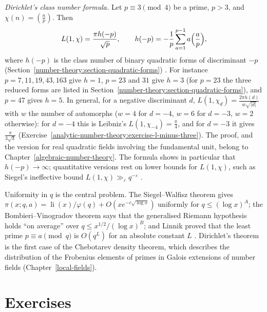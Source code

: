 \begin{remark}\label{analytic-number-theory:remark-class-number-formula}
\emph{Dirichlet's class number formula.} Let $p \equiv 3 \pmod 4$ be a prime, $p > 3$, and $\chi(n) = (\frac np)$. Then
\[
L(1, \chi) = \frac{\pi h(-p)}{\sqrt{p}}, \qquad h(-p) = -\frac1p\sum_{a=1}^{p-1}a\Bigl(\frac ap\Bigr),
\]
where $h(-p)$ is the class number of binary quadratic forms of discriminant $-p$ (Section~\ref{number-theory:section-quadratic-forms}) \cite{davenport-multiplicative}. For instance
$p = 7, 11, 19, 43, 163$ give $h = 1$, $p = 23$ and $31$ give $h = 3$ (for $p = 23$ the three reduced forms are listed in Section~\ref{number-theory:section-quadratic-forms}), and $p = 47$ gives $h = 5$. In general,
for a negative discriminant $d$, $L(1, \chi_d) = \frac{2\pi h(d)}{w\sqrt{|d|}}$ with $w$ the number of automorphs ($w = 4$ for $d = -4$, $w = 6$ for $d = -3$, $w = 2$ otherwise): for $d = -4$ this is
Leibniz's $L(1, \chi_{-4}) = \frac\pi4$, and for $d = -3$ it gives $\frac{\pi}{3\sqrt3}$ (Exercise~\ref{analytic-number-theory:exercise-l-minus-three}). The proof, and the version for real quadratic fields
involving the fundamental unit, belong to Chapter~\ref{algebraic-number-theory}. The formula shows in particular that $h(-p) \to \infty$; quantitative versions rest on lower bounds for $L(1, \chi)$, such as
Siegel's ineffective bound $L(1, \chi) \gg_\varepsilon q^{-\varepsilon}$ \cite{davenport-multiplicative}.
\end{remark}

\begin{remark}\label{analytic-number-theory:remark-progressions-further}
Uniformity in $q$ is the central problem. The Siegel--Walfisz theorem gives $\pi(x; q, a) = \operatorname{li}(x)/\varphi(q) + O(xe^{-c\sqrt{\log x}})$ uniformly for $q \leq (\log x)^A$; the Bombieri--Vinogradov
theorem says that the generalised Riemann hypothesis holds ``on average'' over $q \leq x^{1/2}/(\log x)^B$; and Linnik proved that the least prime $p \equiv a \pmod q$ is $O(q^L)$ for an absolute constant
$L$ \cite{iwaniec-kowalski}. Dirichlet's theorem is the first case of the Chebotarev density theorem, which describes the distribution of the Frobenius elements of primes in Galois extensions of number
fields (Chapter~\ref{local-fields}).
\end{remark}

\section{Exercises}\label{analytic-number-theory:section-exercises}

